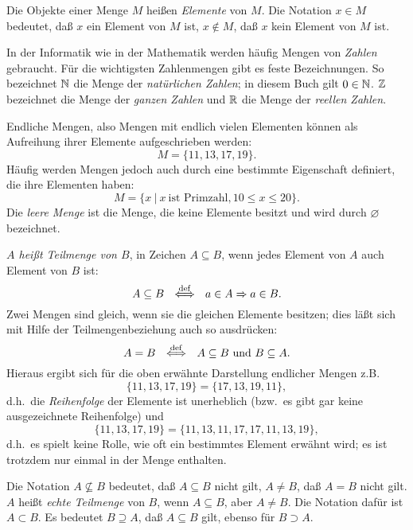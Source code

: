 Die Objekte einer Menge $M$ heißen \emph{Elemente} von $M$. Die Notation
$ x \in M$ 
bedeutet, daß $x$ ein Element von $M$ ist, $x \not \in M$, daß $x$ kein
Element von $M$ ist.

In der Informatik wie in der Mathematik werden häufig Mengen von \emph{Zahlen} gebraucht.  Für die wichtigsten
Zahlenmengen gibt es feste Bezeichnungen.  So bezeichnet $\mathbb{N}$
die Menge der \emph{natürlichen Zahlen};  in diesem Buch gilt
$0\in\mathbb{N}$. 
$\mathbb{Z}$ bezeichnet die Menge der \emph{ganzen Zahlen} und $\mathbb{R}$ die Menge der
\emph{reellen Zahlen}.

Endliche Mengen, also Mengen mit endlich vielen Elementen
können als Aufreihung ihrer Elemente aufgeschrieben werden:
\[M = \{ 11, 13, 17, 19\}.\]
Häufig werden Mengen jedoch auch durch eine bestimmte Eigenschaft de\-fi\-niert,
die ihre Elementen haben:
\[M = \{x\ |\ x\ \mbox{ist Primzahl}, 10 \le x \le 20\}.\]
Die \emph{leere Menge} %
ist die Menge, die keine Elemente besitzt und wird
durch $\varnothing$ bezeichnet.

\emph{$A$ heißt Teilmenge von $B$}, in Zeichen $A \subseteq B$, 
wenn jedes Element von $A$ auch Element von $B$ ist:
\[A \subseteq B\ \ \diff\ \ 
a \in A \Rightarrow a \in B.\]
Zwei Mengen sind gleich, wenn sie die gleichen Elemente besitzen; 
dies läßt sich mit Hilfe der Teilmengenbeziehung auch so ausdrücken:
\[A = B\ \ \stackrel{\rm def}{\Longleftrightarrow}\ \ A \subseteq B\ \mbox{und}\ B \subseteq A.\]
Hieraus ergibt sich für die oben erwähnte Darstellung endlicher Mengen
z.B.
\[\{11,13,17,19\} =\{17,13,19,11\},\]
d.h.\ die \emph{Reihenfolge} der Elemente ist unerheblich (bzw.\ es gibt
gar keine ausgezeichnete Reihenfolge) und
\[\{11,13,17,19\} = \{11,13,11,17,17,11,13,19\},\]
d.h.\ es spielt keine Rolle, wie oft ein bestimmtes Element erwähnt wird; es
ist trotzdem nur einmal in der Menge enthalten.

Die Notation $A \not \subseteq B$ bedeutet, daß $A \subseteq B$ nicht gilt, $A
\not = B$, daß $A = B$ nicht gilt. $A$ heißt \emph{echte Teilmenge} von $B$,
wenn $A \subseteq B$, aber $A \not = B$. Die Notation dafür ist $A \subset B$.
\index{*@$\subset$}\index{*@$\supseteq$}\index{*@$\supset$}
Es bedeutet $B \supseteq A$, daß $A \subseteq B$ gilt, ebenso für
$B \supset A$. 

